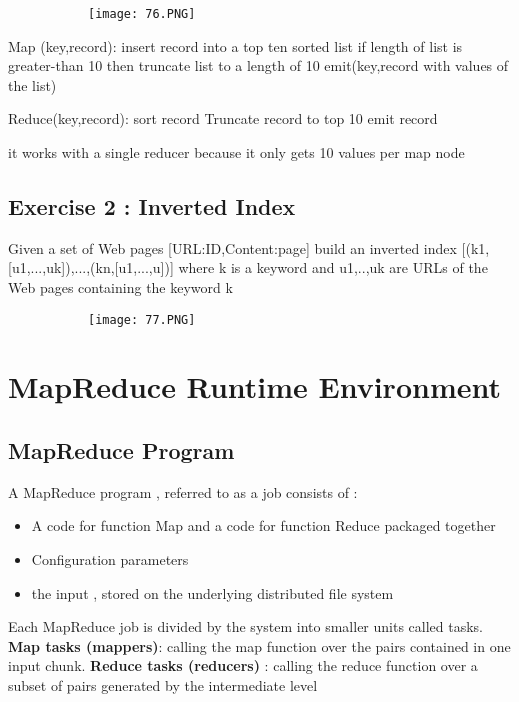 \documentclass{article}
\begin{document}
\begin{figure}[ht!]
  \centering
  \begin{subfigure}[b]{0.5\linewidth}
    \texttt{[image: 76.PNG]}
  \end{subfigure}
\end{figure}

Map (key,record): 
insert record into a top ten sorted list 
if length of list is greater-than 10 then 
truncate list to a length of 10
emit(key,record with values of the list)

Reduce(key,record):
sort record 
Truncate record to top 10
emit record

it works with a single reducer because it only gets 10 values per map node

\subsection{Exercise 2 : Inverted Index}
Given a set of Web pages [URL:ID,Content:page] build an inverted index [(k1,[u1,...,uk]),...,(kn,[u1,...,u])] where k is a keyword and u1,..,uk are URLs of the Web pages containing the keyword k

\begin{figure}[ht!]
  \centering
  \begin{subfigure}[b]{0.5\linewidth}
    \texttt{[image: 77.PNG]}
  \end{subfigure}
\end{figure}



\section{MapReduce Runtime Environment}
\subsection{MapReduce Program}
A MapReduce program , referred to as a job consists of :
\begin{itemize}
    \item A code for function Map and a code for function Reduce packaged together \item Configuration parameters
    \item the input , stored on the underlying distributed file system
\end{itemize}

Each MapReduce job is divided by the system into smaller units called tasks.
\textbf{Map tasks (mappers)}: calling the map function over the pairs contained in one input chunk.
\textbf{Reduce tasks (reducers)} : calling the reduce function over a subset of pairs generated by the intermediate level
\end{document}

